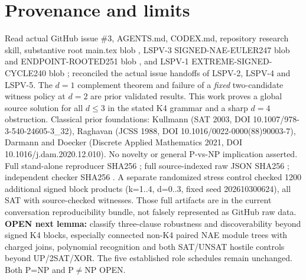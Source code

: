 \documentclass[10pt]{article}
\begin{document}
\section{Provenance and limits}
Read actual GitHub issue \#3, AGENTS.md, CODEX.md, repository research skill, substantive root main.tex blob , LSPV-3 SIGNED-NAE-EULER247 blob  and ENDPOINT-ROOTED251 blob , and LSPV-1 EXTREME-SIGNED-CYCLE240 blob ; reconciled the actual issue handoffs of LSPV-2, LSPV-4 and LSPV-5. The $d=1$ complement theorem and failure of a \emph{fixed} two-candidate witness policy at $d=2$ are prior validated results. This work proves a global source solution for all $d\le3$ in the stated K4 grammar and a sharp $d=4$ obstruction. Classical prior foundations: Kullmann (SAT 2003, DOI 10.1007/978-3-540-24605-3_32), Raghavan (JCSS 1988, DOI 10.1016/0022-0000(88)90003-7), Darmann and Doecker (Discrete Applied Mathematics 2021, DOI 10.1016/j.dam.2020.12.010). No novelty or general P-vs-NP implication asserted.
Full stand-alone reproducer SHA256 ; full source-indexed raw JSON SHA256 ; independent checker SHA256 . A separate randomized stress control checked 1200 additional signed block products (k=1..4, d=0..3, fixed seed 202610300624), all SAT with source-checked witnesses. Those full artifacts are in the current conversation reproducibility bundle, not falsely represented as GitHub raw data.
\noindent\textbf{OPEN next lemma:} classify three-clause robustness and discoverability beyond signed K4 blocks, especially connected non-K4 paired NAE module trees with charged joins, polynomial recognition and both SAT/UNSAT hostile controls beyond UP/2SAT/XOR. The five established role schedules remain unchanged. Both P=NP and P$\ne$NP OPEN.
\end{document}
